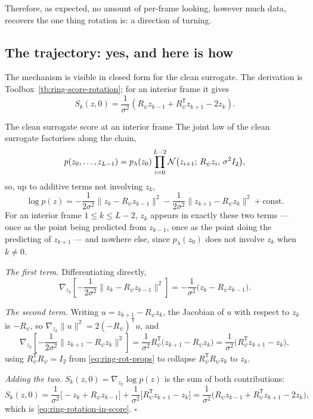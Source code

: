 Therefore, as expected, no amount of per-frame looking, however much data, recovers the one thing
rotation is: a direction of turning.

\subsection{The trajectory: yes, and here is how}
\label{sec:ring-how-score-contains-rotation}

The mechanism is visible in closed form for the clean surrogate.
The derivation is Toolbox~\ref{tb:ring-score-rotation}; for an interior
frame it gives
\begin{equation}
  S_k(z,0)
  =\frac{1}{\sigma^2}
  \left(
    R_\psi z_{k-1}
    +R_\psi^{\mathsf T}z_{k+1}
    -2z_k
  \right).
  \label{eq:ring-rotation-in-score}
\end{equation}

\begin{toolbox}{The clean surrogate score at an
interior frame}
The joint law of the clean surrogate factorises along the chain,
\[
  p(z_0,\dots,z_{L-1})
  = p_\lambda(z_0)\prod_{i=0}^{L-2}
    \mathcal{N}\big(z_{i+1};\,R_\psi z_i,\,\sigma^2 I_2\big),
\]
so, up to additive terms not involving $z_k$,
\[
  \log p(z)
  =
  -\frac{1}{2\sigma^2}\big\lVert z_k - R_\psi z_{k-1}\big\rVert^2
  -\frac{1}{2\sigma^2}\big\lVert z_{k+1} - R_\psi z_k\big\rVert^2
  + \mathrm{const}.
\]
For an interior frame $1\le k\le L-2$, $z_k$ appears in exactly these two
terms --- once as the point being predicted from $z_{k-1}$, once as the
point doing the predicting of $z_{k+1}$ --- and nowhere else, since
$p_\lambda(z_0)$ does not involve $z_k$ when $k\neq0$.

\emph{The first term.} Differentiating directly,
\[
  \nabla_{z_k}\left[-\frac{1}{2\sigma^2}\lVert z_k-R_\psi z_{k-1}\rVert^2\right]
  = -\frac{1}{\sigma^2}\big(z_k - R_\psi z_{k-1}\big).
\]

\emph{The second term.} Writing $u = z_{k+1}-R_\psi z_k$, the Jacobian of
$u$ with respect to $z_k$ is $-R_\psi$, so
$\nabla_{z_k}\lVert u\rVert^2 = 2(-R_\psi)^{\mathsf T}u$, and
\[
  \nabla_{z_k}\left[-\frac{1}{2\sigma^2}\lVert z_{k+1}-R_\psi z_k\rVert^2\right]
  = \frac{1}{\sigma^2}R_\psi^{\mathsf T}\big(z_{k+1}-R_\psi z_k\big)
  = \frac{1}{\sigma^2}\Big(R_\psi^{\mathsf T}z_{k+1} - z_k\Big),
\]
using $R_\psi^{\mathsf T}R_\psi = I_2$ from \eqref{eq:ring-rot-props} to
collapse $R_\psi^{\mathsf T}R_\psi z_k$ to $z_k$.

\emph{Adding the two.} $S_k(z,0)=\nabla_{z_k}\log p(z)$ is the sum of both
contributions:
\[
  S_k(z,0)
  = \frac{1}{\sigma^2}\Big[-z_k + R_\psi z_{k-1}\Big]
  + \frac{1}{\sigma^2}\Big[R_\psi^{\mathsf T}z_{k+1} - z_k\Big]
  = \frac{1}{\sigma^2}\Big(R_\psi z_{k-1} + R_\psi^{\mathsf T}z_{k+1} - 2z_k\Big),
\]
which is \eqref{eq:ring-rotation-in-score}. \hfill$\square$
\end{toolbox}

